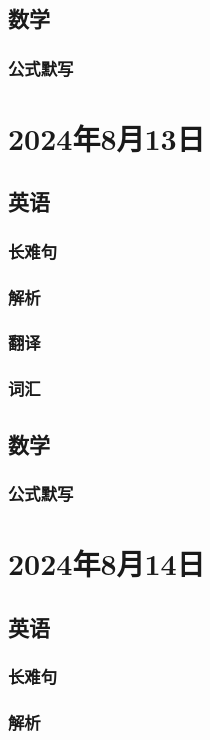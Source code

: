 \documentclass[UTF8]{ctexart}
\begin{document}
\subsection{数学}
\subsubsection{公式默写}
\begin{multicols}{2}
\end{multicols}
\section{2024年8月13日}
\subsection{英语}
\subsubsection{长难句}
\subsubsection{解析}
\subsubsection{翻译}
\subsubsection{词汇}
\subsection{数学}
\subsubsection{公式默写}
\begin{multicols}{2}
\end{multicols}
\section{2024年8月14日}
\subsection{英语}
\subsubsection{长难句}
\subsubsection{解析}
\end{document}
